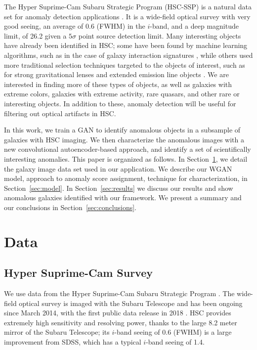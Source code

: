 The Hyper Suprime-Cam Subaru Strategic Program (HSC-SSP) is a natural data set for anomaly detection applications \citep{Miyazaki2018}.
It is a wide-field optical survey with very good seeing, an average of 0.6 (FWHM) in the $i$-band, and a deep magnitude limit, of 26.2 given a $5\sigma$ point source detection limit.
Many interesting objects have already been identified in HSC; some have been found by machine learning algorithms, such as in the case of galaxy interaction signatures \citep{Goulding2017}, while others used more traditional selection techniques targeted to the objects of interest, such as for strong gravitational lenses \citep{Wong2018} and extended emission line objects \citep{Sun2018}.
We are interested in finding more of these types of objects, as well as galaxies with extreme colors, galaxies with extreme activity, rare quasars, and other rare or interesting objects.
In addition to these, anomaly detection will be useful for filtering out optical artifacts in HSC.

In this work, we train a GAN to identify anomalous objects in a subsample of galaxies with HSC imaging.
We then characterize the anomalous images with a new convolutional autoencoder-based approach, and identify a set of scientifically interesting anomalies.
This paper is organized as follows.
In Section~\ref{sec:data}, we detail the galaxy image data set used in our application.
We describe our WGAN model, approach to anomaly score assignment, technique for characterization,  in Section~\ref{sec:model}.
In Section~\ref{sec:results} we discuss our results and show anomalous galaxies identified with our framework.
We present a summary and our conclusions in Section~\ref{sec:conclusions}.

\section{Data}
\label{sec:data}

\subsection{Hyper Suprime-Cam Survey}

We use data from the Hyper Suprime-Cam Subaru Strategic Program \citep{Aihara2018a}.
The wide-field optical survey is imaged with the Subaru Telescope and has been ongoing since March 2014, with the first public data release in 2018 \citep{Aihara2018b}.
HSC provides extremely high sensitivity and resolving power, thanks to the large 8.2 meter mirror of the Subaru Telescope; its $i$-band seeing of 0.6 (FWHM) is a large improvement from SDSS, which has a typical $i$-band seeing of 1.4.

